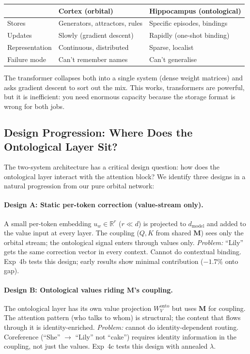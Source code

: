 \documentclass[11pt, a4paper]{article}
\newcommand{\M}{\mathbf{M}}
\newcommand{\R}{\mathbb{R}}
\theoremstyle{remark}
\begin{document}
\begin{center}\small
\begin{tabular}{@{}lll@{}}
\toprule
& \textbf{Cortex} (orbital) & \textbf{Hippocampus} (ontological) \\
\midrule
Stores & Generators, attractors, rules & Specific episodes, bindings \\
Updates & Slowly (gradient descent) & Rapidly (one-shot binding) \\
Representation & Continuous, distributed & Sparse, localist \\
Failure mode & Can't remember names & Can't generalise \\
\bottomrule
\end{tabular}
\end{center}

The transformer collapses both into a single system (dense weight matrices) and asks gradient descent to sort out the mix.
This works, transformers are powerful, but it is inefficient: you need enormous capacity because the storage format is wrong for both jobs.

\subsection{Design Progression: Where Does the Ontological Layer Sit?}

The two-system architecture has a critical design question: how does the ontological layer interact with the attention block?
We identify three designs in a natural progression from our pure orbital network:

\paragraph{Design A: Static per-token correction (value-stream only).}
A small per-token embedding $u_w \in \R^r$ ($r \ll d$) is projected to $d_{\text{model}}$ and added to the value input at every layer.
The coupling ($Q, K$ from shared $\M$) sees only the orbital stream; the ontological signal enters through values only.
\textit{Problem:} ``Lily'' gets the same correction vector in every context.
Cannot do contextual binding.
Exp~4b tests this design; early results show minimal contribution ($-1.7\%$ onto gap).

\paragraph{Design B: Ontological values riding $\M$'s coupling.}
The ontological layer has its own value projection $W_V^{\text{onto}}$ but uses $\M$ for coupling.
The attention pattern (who talks to whom) is structural; the content that flows through it is identity-enriched.
\textit{Problem:} cannot do identity-dependent routing.
Coreference (``She'' $\to$ ``Lily'' not ``cake'') requires identity information in the coupling, not just the values.
Exp~4c tests this design with annealed $\lambda$.
\end{document}
